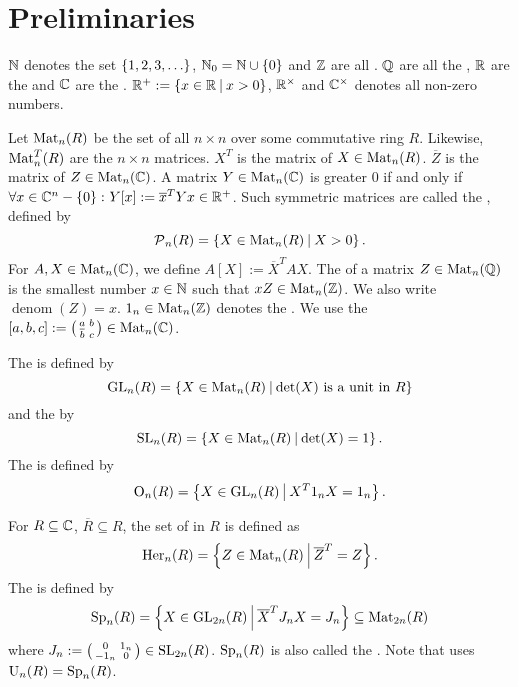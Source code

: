 

\section{Preliminaries}

$\mathbb{N}$ denotes the set $\Set{1,2,3,\dots}$, $\N_0 = \N \cup \Set{0}$ and $\mathbb{Z}$ are all . $\mathbb{Q}$ are all the , $\mathbb{R}$ are the  and $\mathbb{C}$ are the . $\R^+ := \Set{x\in\R}{x>0}$, $\mathbb{R}^\times$ and $\mathbb{C}^\times$ denotes all non-zero numbers.

Let $\operatorname{Mat}_n(R)$ be the set of all $n \times n$  over some commutative ring $R$.
Likewise, $\operatorname{Mat}_n^T(R)$ are the  $n \times n$ matrices.
$X^T$ is the  matrix of $X \in \operatorname{Mat}_n(R)$.
$\overline{Z}$ is the  matrix of $Z \in \operatorname{Mat}_n(\mathbb{C})$.
A matrix $Y \in \operatorname{Mat}_n(\mathbb{C})$ is greater $0$ if and only if $\forall x \in \C^n - \Set{0} \colon Y[x] := \overline{x}^{T} Y x \in \R^+$.
Such symmetric matrices are called the , defined by
\[ \PM_n(R) = \Set{X \in \M_n(R)}{X > 0}. \]
For $A,X \in \operatorname{Mat}_n(\mathbb{C})$, we define $A[X] := \overline{X}^T A X$. 
The  of a matrix $Z \in \operatorname{Mat}_n(\mathbb{Q})$ is the smallest number $x \in \mathbb{N}$ such that $x Z \in \operatorname{Mat}_n(\mathbb{Z})$. We also write $\operatorname{denom}(Z) = x$. $1_n \in \operatorname{Mat}_n(\mathbb{Z})$ denotes the . We use the  $[a,b,c] := \left( \begin{smallmatrix} a & b \\ \overline b & c \end{smallmatrix} \right) \in \operatorname{Mat}_n(\mathbb{C})$.

The  is defined by
\[ \GL_n(R) = \Set{X \in \M_n(R)}{\text{$\det(X)$ is a unit in $R$}} \]
and the  by
\[ \SL_n(R) = \Set{X \in \M_n(R)}{\det(X) = 1} . \] %
The  is defined by
\[ \Orth_n(R) = \Set{X \in \GL_n(R)}{X^T 1_n X = 1_n} . \] %

For $R \subseteq \mathbb{C}$, $\overline{R} \subseteq R$, the set of  in $R$ is defined as
\[ \Her_n(R) = \Set{Z \in \M_n(R)}{\overline{Z}^T = Z} . \]
The  is defined by
\[ \Sp_n(R) = \Set{X \in \GL_{2n}(R)}{\overline{X}^T J_n X = J_n} \subseteq \M_{2n}(R) \] %
where $J_n := \left( \begin{smallmatrix} 0 & 1_n \\ -1_n & 0 \end{smallmatrix} \right) \in \operatorname{SL}_{2n}(R)$. %
$\operatorname{Sp}_n(R)$ is also called the . Note that \cite{Dern01Herm} uses $\operatorname{U}_n(R) = \operatorname{Sp}_n(R)$.

